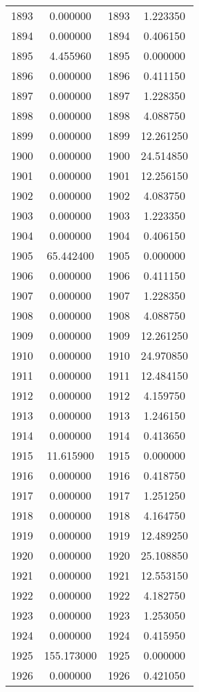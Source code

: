 \documentclass[12pt]{article}
\begin{document}
\begin{longtable}{@{}cccc@{}}
1893 & 0.000000 & 1893 & 1.223350 \\
1894 & 0.000000 & 1894 & 0.406150 \\
1895 & 4.455960 & 1895 & 0.000000 \\
1896 & 0.000000 & 1896 & 0.411150 \\
1897 & 0.000000 & 1897 & 1.228350 \\
1898 & 0.000000 & 1898 & 4.088750 \\
1899 & 0.000000 & 1899 & 12.261250 \\
1900 & 0.000000 & 1900 & 24.514850 \\
1901 & 0.000000 & 1901 & 12.256150 \\
1902 & 0.000000 & 1902 & 4.083750 \\
1903 & 0.000000 & 1903 & 1.223350 \\
1904 & 0.000000 & 1904 & 0.406150 \\
1905 & 65.442400 & 1905 & 0.000000 \\
1906 & 0.000000 & 1906 & 0.411150 \\
1907 & 0.000000 & 1907 & 1.228350 \\
1908 & 0.000000 & 1908 & 4.088750 \\
1909 & 0.000000 & 1909 & 12.261250 \\
1910 & 0.000000 & 1910 & 24.970850 \\
1911 & 0.000000 & 1911 & 12.484150 \\
1912 & 0.000000 & 1912 & 4.159750 \\
1913 & 0.000000 & 1913 & 1.246150 \\
1914 & 0.000000 & 1914 & 0.413650 \\
1915 & 11.615900 & 1915 & 0.000000 \\
1916 & 0.000000 & 1916 & 0.418750 \\
1917 & 0.000000 & 1917 & 1.251250 \\
1918 & 0.000000 & 1918 & 4.164750 \\
1919 & 0.000000 & 1919 & 12.489250 \\
1920 & 0.000000 & 1920 & 25.108850 \\
1921 & 0.000000 & 1921 & 12.553150 \\
1922 & 0.000000 & 1922 & 4.182750 \\
1923 & 0.000000 & 1923 & 1.253050 \\
1924 & 0.000000 & 1924 & 0.415950 \\
1925 & 155.173000 & 1925 & 0.000000 \\
1926 & 0.000000 & 1926 & 0.421050 \\

\end{longtable}
\end{document}
